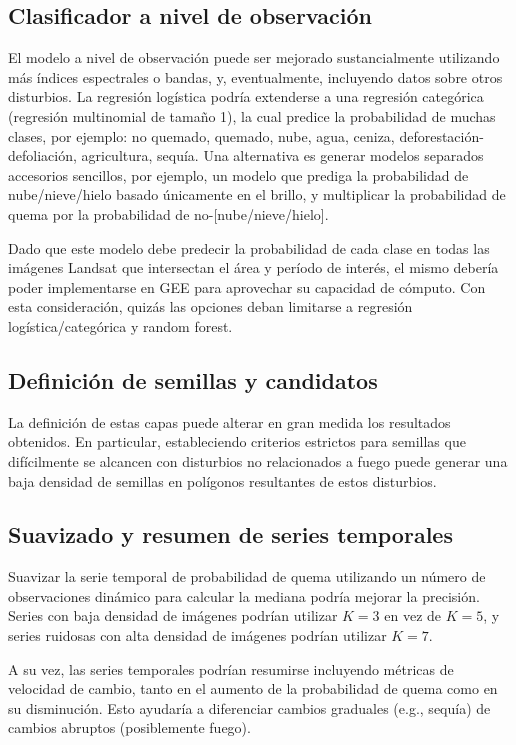 \documentclass[11pt,a4paper]{article}
\begin{document}
\subsection{Clasificador a nivel de observación}

El modelo a nivel de observación puede ser mejorado sustancialmente utilizando más índices espectrales o bandas, y, eventualmente, incluyendo datos sobre otros disturbios. La regresión logística podría extenderse a una regresión categórica (regresión multinomial de tamaño 1), la cual predice la probabilidad de muchas clases, por ejemplo: no quemado, quemado, nube, agua, ceniza, deforestación-defoliación, agricultura, sequía. Una alternativa es generar modelos separados accesorios sencillos, por ejemplo, un modelo que prediga la probabilidad de nube/nieve/hielo basado únicamente en el brillo, y multiplicar la probabilidad de quema por la probabilidad de no-[nube/nieve/hielo]. 

Dado que este modelo debe predecir la probabilidad de cada clase en todas las imágenes Landsat que intersectan el área y período de interés, el mismo debería poder implementarse en GEE para aprovechar su capacidad de cómputo. Con esta consideración, quizás las opciones deban limitarse a regresión logística/categórica y random forest.

\subsection{Definición de semillas y candidatos}

La definición de estas capas puede alterar en gran medida los resultados obtenidos. En particular, estableciendo criterios estrictos para semillas que difícilmente se alcancen con disturbios no relacionados a fuego puede generar una baja densidad de semillas en polígonos resultantes de estos disturbios.

\subsection{Suavizado y resumen de series temporales}

Suavizar la serie temporal de probabilidad de quema utilizando un número de observaciones dinámico para calcular la mediana podría mejorar la precisión. Series con baja densidad de imágenes podrían utilizar $K=3$ en vez de $K=5$, y series ruidosas con alta densidad de imágenes podrían utilizar $K=7$. 

A su vez, las series temporales podrían resumirse incluyendo métricas de velocidad de cambio, tanto en el aumento de la probabilidad de quema como en su disminución. Esto ayudaría a diferenciar cambios graduales (e.g., sequía) de cambios abruptos (posiblemente fuego).
\end{document}
